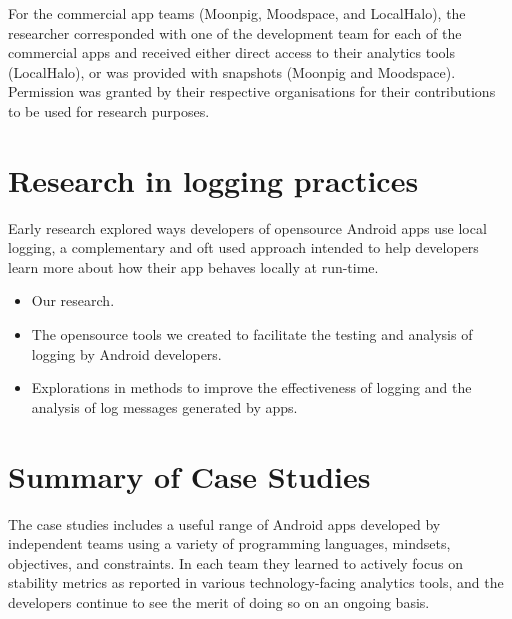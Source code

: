 For the commercial app teams (Moonpig, Moodspace, and LocalHalo), the researcher corresponded with one of the development team for each of the commercial apps and received either direct access to their analytics tools (LocalHalo), or was provided with snapshots (Moonpig and Moodspace). Permission was granted by their respective organisations for their contributions to be used for research purposes.
\newpage


\newpage


\newpage


\newpage



\section{Research in logging practices}
Early research explored ways developers of opensource Android apps use local logging, a complementary and oft used approach intended to help developers learn more about how their app behaves locally at run-time. 

\begin{itemize}
    \item Our research.
    \item The opensource tools we created to facilitate the testing and analysis of logging by Android developers.
    \item Explorations in methods to improve the effectiveness of logging and the analysis of log messages generated by apps.
\end{itemize}



\section{Summary of Case Studies}
The case studies includes a useful range of Android apps developed by independent teams using a variety of programming languages, mindsets, objectives, and constraints. In each team they learned to actively focus on stability metrics as reported in various technology-facing analytics tools, and the developers continue to see the merit of doing so on an ongoing basis.